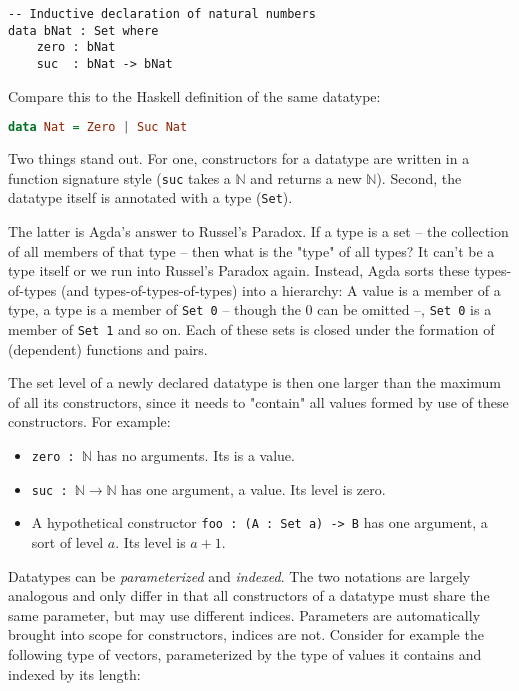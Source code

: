 \begin{lstlisting}[caption={Datatype definitions},label={lst:tutorial:datatypes},emph={zero,suc}]
-- Inductive declaration of natural numbers
data bNat : Set where
    zero : bNat
    suc  : bNat -> bNat
\end{lstlisting}

Compare this to the Haskell definition of the same datatype:

\begin{lstlisting}[caption={Peano Numbers in Haskell},label={lst:haskell:peano},language=haskell,emph={Zero,Suc}]
data Nat = Zero | Suc Nat
\end{lstlisting}

Two things stand out. For one, constructors for a datatype are written in a function signature style (\texttt{suc} takes a \texttt{$\mathbb N$} and returns a new \texttt{$\mathbb N$}). Second, the datatype itself is annotated with a type (\texttt{Set}).

The latter is Agda's answer to Russel's Paradox. If a type is a set -- the collection of all members of that type -- then what is the "type" of all types? It can't be a type itself or we run into Russel's Paradox again. Instead, Agda sorts these types-of-types (and types-of-types-of-types) into a hierarchy: A value is a member of a type, a type is a member of \texttt{Set 0} -- though the 0 can be omitted --, \texttt{Set 0} is a member of \texttt{Set 1} and so on. Each of these sets is closed under the formation of (dependent) functions and pairs.

The set level of a newly declared datatype is then one larger than the maximum of all its constructors, since it needs to "contain" all values formed by use of these constructors. For example:

\begin{itemize}
    \setlength\itemsep{-0.4em}
    \item \texttt{zero : $\mathbb N$} has no arguments. Its is a value.
    \item \texttt{suc : $\mathbb N \to \mathbb N$}  has one argument, a value. Its level is zero.
    \item A hypothetical constructor \texttt{foo : (A : Set a) -> B} has one argument, a sort of level $a$. Its level is $a + 1$.
\end{itemize}

Datatypes can be \emph{parameterized} and \emph{indexed}. The two notations are largely analogous and only differ in that all constructors of a datatype must share the same parameter, but may use different indices. Parameters are automatically brought into scope for constructors, indices are not. Consider for example the following type of vectors, parameterized by the type of values it contains and indexed by its length:

